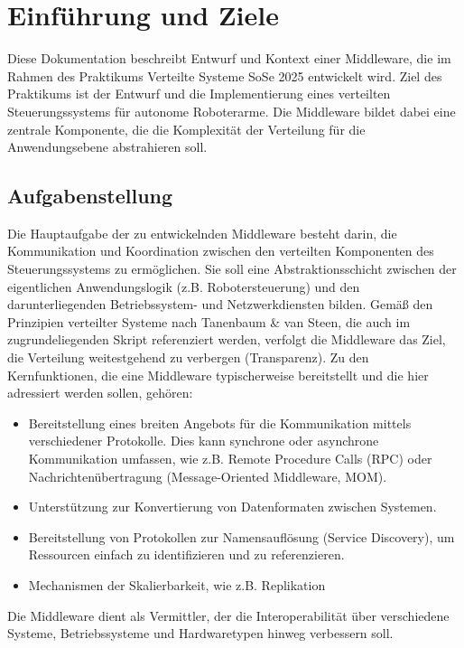 \chapter{Einführung und Ziele}

Diese Dokumentation beschreibt Entwurf und Kontext einer Middleware, die im Rahmen des Praktikums \glqq Verteilte Systeme SoSe 2025\grqq{} entwickelt wird. Ziel des Praktikums ist der Entwurf und die Implementierung eines verteilten Steuerungssystems für autonome Roboterarme. Die Middleware bildet dabei eine zentrale Komponente, die die Komplexität der Verteilung für die Anwendungsebene abstrahieren soll.


\section{Aufgabenstellung}
Die Hauptaufgabe der zu entwickelnden Middleware besteht darin, die Kommunikation und Koordination zwischen den verteilten Komponenten des Steuerungssystems zu ermöglichen. Sie soll eine Abstraktionsschicht zwischen der eigentlichen Anwendungslogik (z.B. Robotersteuerung) und den darunterliegenden Betriebssystem- und Netzwerkdiensten bilden. Gemäß den Prinzipien verteilter Systeme nach Tanenbaum \& van Steen, die auch im zugrundeliegenden Skript referenziert werden, verfolgt die Middleware das Ziel, die Verteilung weitestgehend zu verbergen (Transparenz).
Zu den Kernfunktionen, die eine Middleware typischerweise bereitstellt und die hier adressiert werden sollen, gehören:

\begin{itemize}
	\item Bereitstellung eines breiten Angebots für die Kommunikation mittels verschiedener Protokolle. Dies kann synchrone oder asynchrone Kommunikation umfassen, wie z.B. Remote Procedure Calls (RPC) oder Nachrichtenübertragung (Message-Oriented Middleware, MOM).
	\item Unterstützung zur Konvertierung von Datenformaten zwischen Systemen.
	\item Bereitstellung von Protokollen zur Namensauflösung (Service Discovery), um Ressourcen einfach zu identifizieren und zu referenzieren.
	\item Mechanismen der Skalierbarkeit, wie z.B. Replikation	
\end{itemize}


Die Middleware dient als Vermittler, der die Interoperabilität über verschiedene Systeme, Betriebssysteme und Hardwaretypen hinweg verbessern soll.


